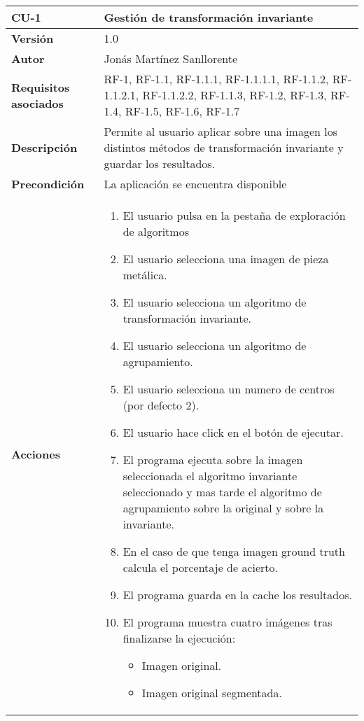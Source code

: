 \begin{table}[p]
	\centering
	\begin{tabularx}{\linewidth}{ p{} p{} }
		\toprule
		\textbf{CU-1}    & \textbf{Gestión de transformación invariante}\\
		\toprule
		\textbf{Versión}              & 1.0    \\
		\textbf{Autor}                & Jonás Martínez Sanllorente \\
		\textbf{Requisitos asociados} & RF-1, RF-1.1, RF-1.1.1, RF-1.1.1.1, RF-1.1.2, RF-1.1.2.1, RF-1.1.2.2, RF-1.1.3, RF-1.2, RF-1.3, RF-1.4, RF-1.5, RF-1.6, RF-1.7 \\
		\textbf{Descripción}          & Permite al usuario aplicar sobre una imagen los distintos métodos de transformación invariante y guardar los resultados.\\
		\textbf{Precondición}         & La aplicación se encuentra disponible \\
		\textbf{Acciones}             &
		\begin{enumerate}
			\def\labelenumi{\arabic{enumi}.}
			\tightlist
			\item El usuario pulsa en la pestaña de exploración de algoritmos
            \item El usuario selecciona una imagen de pieza metálica.
            \item El usuario selecciona un algoritmo de transformación invariante.
            \item El usuario selecciona un algoritmo de agrupamiento.
            \item El usuario selecciona un numero de centros (por defecto 2).
            \item El usuario hace click en el botón de ejecutar.
            \item El programa ejecuta sobre la imagen seleccionada el algoritmo invariante seleccionado y mas tarde el algoritmo de agrupamiento sobre la original y sobre la invariante.
            \item En el caso de que tenga imagen ground truth calcula el porcentaje de acierto.
            \item El programa guarda en la cache los resultados.
            \item El programa muestra cuatro imágenes tras finalizarse la ejecución:
            \begin{itemize}
                \item Imagen original.
                \item Imagen original segmentada.

\end{itemize}
\end{enumerate}
\end{tabularx}
\end{table}
